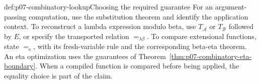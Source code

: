 \begin{hbmethod}{def:p07-combinatory-lookup}{Choosing the required guarantee}
For an argument-passing computation, use the substitution theorem and identify
the application context.  To reconstruct a lambda expression modulo beta,
use \(T_{\mathcal A}\) or \(T_{\mathcal B}\) followed by \(E\), or specify the
transported relation \(=_{\lambda\beta}\).  To compare extensional functions,
state \(=_{\mathrm e}\), with its fresh-variable rule and the corresponding
beta-eta theorem.  An eta optimization uses the guarantees of
Theorem~\ref{thm:p07-combinatory-eta-boundary}.  When a compiled function is
compared before being applied, the equality choice is part of the claim.
\end{hbmethod}
